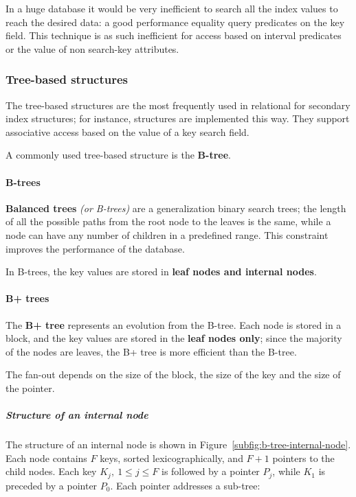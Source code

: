 \documentclass[english]{article}
\begin{document}
In a huge database it would be very inefficient to search all the index values to reach the desired data:
a good performance equality query predicates on the key field.
This technique is as such inefficient for access based on interval predicates or the value of non search-key attributes.

\subsubsection{Tree-based structures}

The tree-based structures are the most frequently used in relational \dbms for secondary index structures;
for instance, \sql structures are implemented this way.
They support associative access based on the value of a key search field.

A commonly used tree-based structure is the \textbf{B-tree}.

\paragraph{B-trees}
\textbf{Balanced trees} \textit{(or B-trees)} are a generalization binary search trees;
the length of all the possible paths from the root node to the leaves is the same, while a node can have any number of children in a predefined range.
This constraint improves the performance of the database.

In B-trees, the key values are stored in \textbf{leaf nodes and internal nodes}.

\paragraph{B+ trees}

The \textbf{B+ tree} represents an evolution from the B-tree.
Each node is stored in a block, and the key values are stored in the \textbf{leaf nodes only};
since the majority of the nodes are leaves, the B+ tree is more efficient than the B-tree.

The fan-out depends on the size of the block, the size of the key and the size of the pointer.

\subparagraph*{Structure of an internal node}
The structure of an internal node is shown in Figure~\ref{subfig:b-tree-internal-node}.
Each node contains \(F\) keys, sorted lexicographically, and \(F + 1\) pointers to the child nodes.
Each key \(K_j, \ 1 \leq j \leq F\) is followed by a pointer \(P_j\), while \(K_1\) is preceded by a pointer \(P_0\).
Each pointer addresses a sub-tree:
\end{document}
